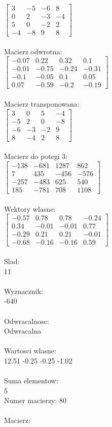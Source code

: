 \documentclass[a4paper,12pt]{article}
\begin{document}
$\begin{bmatrix} 3&-5&-6&8\\0&2&-3&-4\\5&0&-2&2\\-4&-8&9&8 \end{bmatrix}$
\\
\\
Macierz odwrotna:\\

$\begin{bmatrix} -0.07&0.22&0.32&0.1\\-0.01&-0.75&-0.24&-0.31\\-0.1&-0.05&0.1&0.05\\0.07&-0.59&-0.2&-0.19 \end{bmatrix}$
\\
\\
Macierz transponowana:\\

$\begin{bmatrix} 3&0&5&-4\\-5&2&0&-8\\-6&-3&-2&9\\8&-4&2&8 \end{bmatrix}$
\\
\\
Macierz do potegi 3:\\

$\begin{bmatrix} -138&-681&1287&862\\7&435&-456&-576\\-257&-483&625&540\\185&-781&708&1108 \end{bmatrix}$
\\
\\
Wektory wlasne:\\

$\begin{bmatrix} -0.57&0.78&0.78&-0.24\\0.34&-0.01&-0.01&0.77\\-0.29&0.21&0.21&-0.01\\-0.68&-0.16&-0.16&0.59 \end{bmatrix}$
\\
\\
Slad:\\
11
\\
\\
Wyznacznik:\\
-640
\\
\\
Odwracalnosc:\\
Odwracalna
\\
\\
Wartosci wlasne:\\
12.51 -0.25 -0.25 -1.02
\\
\\
Suma elementow:\\
5
\\
\newpage
Numer macierzy:
80
\\
\\
Macierz:\\
\end{document}
